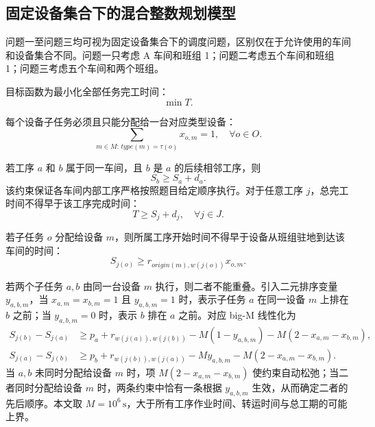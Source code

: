 \subsection{固定设备集合下的混合整数规划模型}

问题一至问题三均可视为固定设备集合下的调度问题，区别仅在于允许使用的车间和设备集合不同。问题一只考虑 A 车间和班组 1；问题二考虑五个车间和班组 1；问题三考虑五个车间和两个班组。

目标函数为最小化全部任务完工时间：
\begin{equation}
  \min T .
  \label{eq:objective}
\end{equation}

每个设备子任务必须且只能分配给一台对应类型设备：
\begin{equation}
  \sum_{m\in M:\,\mathit{type}(m)=\tau(o)} x_{o,m}=1,\quad \forall o\in O .
  \label{eq:assignment}
\end{equation}

若工序 $a$ 和 $b$ 属于同一车间，且 $b$ 是 $a$ 的后续相邻工序，则
\begin{equation}
  S_b\ge S_a+d_a .
  \label{eq:precedence}
\end{equation}
该约束保证各车间内部工序严格按照题目给定顺序执行。对于任意工序 $j$，总完工时间不得早于该工序完成时间：
\begin{equation}
  T\ge S_j+d_j,\quad \forall j\in J .
  \label{eq:makespan}
\end{equation}

若子任务 $o$ 分配给设备 $m$，则所属工序开始时间不得早于设备从班组驻地到达该车间的时间：
\begin{equation}
  S_{j(o)}\ge r_{\mathit{origin}(m),w(j(o))}x_{o,m}.
  \label{eq:initial-arrival}
\end{equation}

若两个子任务 $a,b$ 由同一台设备 $m$ 执行，则二者不能重叠。引入二元排序变量 $y_{a,b,m}$，当 $x_{a,m}=x_{b,m}=1$ 且 $y_{a,b,m}=1$ 时，表示子任务 $a$ 在同一设备 $m$ 上排在 $b$ 之前；当 $y_{a,b,m}=0$ 时，表示 $b$ 排在 $a$ 之前。对应 big-M 线性化为
\begin{align}
S_{j(b)}-S_{j(a)}
&\ge p_a+r_{w(j(a)),w(j(b))}
-M(1-y_{a,b,m})-M(2-x_{a,m}-x_{b,m}), \label{eq:machine-order-1}\\
S_{j(a)}-S_{j(b)}
&\ge p_b+r_{w(j(b)),w(j(a))}
-My_{a,b,m}-M(2-x_{a,m}-x_{b,m}). \label{eq:machine-order-2}
\end{align}
当 $a,b$ 未同时分配给设备 $m$ 时，项 $M(2-x_{a,m}-x_{b,m})$ 使约束自动松弛；当二者同时分配给设备 $m$ 时，两条约束中恰有一条根据 $y_{a,b,m}$ 生效，从而确定二者的先后顺序。本文取 $M=10^6\,\mathrm{s}$，大于所有工序作业时间、转运时间与总工期的可能上界。


